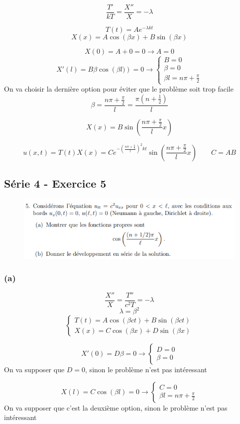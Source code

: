 \documentclass[resume]{subfiles}
\begin{document}
\begin{multicols}{2}
$$\frac{T'}{kT}=\frac{X''}{X}=-\lambda$$

$$T(t)=Ae^{-\lambda kt}$$
$$X(x)=A\cos(\beta x)+B\sin(\beta x)$$

$$X(0)=A + 0 = 0\longrightarrow A=0$$
$$X'(l)=B\beta\cos\left(\beta l)\right)=0\longrightarrow \begin{cases}B=0\\\beta=0\\\beta l=n\pi +\frac{\pi}{2}\end{cases}$$
On va choisir la dernière option pour éviter que le problème soit trop facile
$$\beta=\frac{n\pi +\frac{\pi}{2}}{l}=\frac{\pi\left(n+\frac{1}{2}\right)}{l}$$

$$X(x)=B\sin\left(\frac{n\pi +\frac{\pi}{2}}{l} x\right)$$

$$u(x,t)=T(t)X(x)=Ce^{-\left(\frac{n\pi +\frac{\pi}{2}}{l}\right)^2 kt}\sin\left(\frac{n\pi +\frac{\pi}{2}}{l} x\right)\qquad C=AB$$
\subsection{Série 4 - Exercice 5}
\label{S4E5}
\begin{figure}[H]
\centering
\includegraphics[scale=0.5]{img_13.png}
\end{figure}
\subsubsection{(a)}
$$\frac{X''}{X}=\frac{T''}{c^2 T}=-\lambda$$
$$\lambda=\beta^2$$
$$\begin{cases}
T(t)=A\cos(\beta ct)+B\sin(\beta ct)\\
X(x)=C\cos(\beta x)+D\sin(\beta x)
\end{cases}$$

$$X'(0)=D\beta=0\longrightarrow\begin{cases}D=0\\\beta=0\end{cases}$$
On va supposer que $D=0$, sinon le problème n'est pas intéressant

$$X(l)=C\cos(\beta l)=0\longrightarrow\begin{cases}C=0\\\beta l=n\pi+\frac{\pi}{2}\end{cases}$$
On va supposer que c'est la deuxième option, sinon le problème n'est pas intéressant


\end{multicols}
\end{document}
